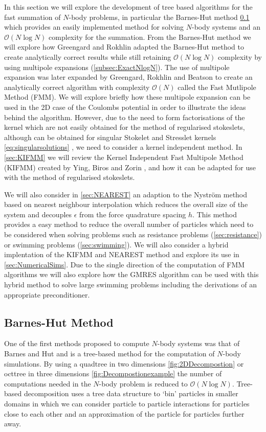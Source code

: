 In this section we will explore the development of tree based algorithms for the fast summation of $N$-body problems, in particular the Barnes-Hut method \cite{Barnes1986} \cref{subsec:BarnesHut} which provides an easily implemented method for solving $N$-body systems and an $\mathcal{O}(N\log N)$ complexity for the summation. From the Barnes-Hut method we will explore how Greengard and Rokhlin \cite{1988The0-262-7110-X.,Rokhlin1985RapidTheory,Greengard1987ASimulations} adapted the Barnes-Hut method to create analytically correct results while still retaining $\mathcal{O}(N\log N)$ complexity by using multipole expansions (\cref{subsec:ExactNlogN}). The use of multipole expansion was later expanded by Greengard, Rokhlin and Beatson \cite{Beatson,Greengard1987ASimulations} to create an analytically correct algorithm with complexity $\mathcal{O}(N)$ called the Fast Mutlipole Method (FMM). We will explore briefly how these multipole expansion can be used in the 2D case of the Coulombs potential in order to illustrate the ideas behind the algorithm. However, due to the need to form factorisations of the kernel which are not easily obtained for the method of regularised stokeslets, although can be obtained for singular Stokelet and Stresslet kernels \cref{eq:singularsolutions} \cite{Tornberg2008}, we need to consider a kernel independent method. In \cref{sec:KIFMM} we will review the Kernel Independent Fast Multipole Method (KIFMM) created by Ying, Biros and Zorin \cite{Ying2004}, and how it can be adapted for use with the method of regularised stokeslets. 

We will also consider in \cref{sec:NEAREST} an adaption to the Nyström method based on nearest neighbour interpolation which reduces the overall size of the system and decouples $\epsilon$ from the force quadrature spacing $h$. This method provides a easy method to reduce the overall number of particles which need to be considered when solving problems such as resistance problems (\cref{sec:resistance}) or swimming problems (\cref{sec:swimming}).
We will also consider a hybrid implentation of the KIFMM and NEAREST method and explore its use in \cref{sec:NumericalSims}. Due to the single direction of the computation of FMM algorithms we will also explore how the GMRES algorithm can be used with this hybrid method to solve large swimming problems including the derivations of an appropriate preconditioner.  

\subsection{Barnes-Hut Method} \label{subsec:BarnesHut}
One of the first methods proposed to compute $N$-body systems was that of Barnes and Hut \cite{Barnes1986} and is a tree-based method for the computation of $N$-body simulations. By using a quadtree in two dimensions \cref{fig:2DDecompostion} or octtree in three dimensions \cref{fig:Decompostionexample} the number of computations needed in the $N$-body problem is reduced to $\mathcal{O}(N\log N)$. Tree-based decomposition uses a tree data structure to `bin' particles in smaller domains in which we can consider particle to particle interactions for particles close to each other and an approximation of the particle for particles further away. 


